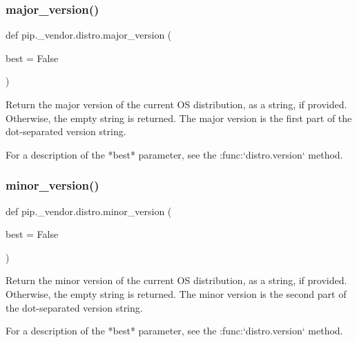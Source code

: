 \mbox{\label{namespacepip_1_1__vendor_1_1distro_a7ba57b1c4ee35dc171765941dd3ec476}} 
\subsubsection{\texorpdfstring{major\+\_\+version()}{major\_version()}}
{\footnotesize\ttfamily def pip.\+\_\+vendor.\+distro.\+major\+\_\+version (\begin{DoxyParamCaption}\item[{}]{best = {\ttfamily False} }\end{DoxyParamCaption})}

\begin{DoxyVerb}Return the major version of the current OS distribution, as a string,
if provided.
Otherwise, the empty string is returned. The major version is the first
part of the dot-separated version string.

For a description of the *best* parameter, see the :func:`distro.version`
method.
\end{DoxyVerb}
 \mbox{\label{namespacepip_1_1__vendor_1_1distro_a27fb0b8ec4acf78ab726aea7fa592bb9}} 
\subsubsection{\texorpdfstring{minor\+\_\+version()}{minor\_version()}}
{\footnotesize\ttfamily def pip.\+\_\+vendor.\+distro.\+minor\+\_\+version (\begin{DoxyParamCaption}\item[{}]{best = {\ttfamily False} }\end{DoxyParamCaption})}

\begin{DoxyVerb}Return the minor version of the current OS distribution, as a string,
if provided.
Otherwise, the empty string is returned. The minor version is the second
part of the dot-separated version string.

For a description of the *best* parameter, see the :func:`distro.version`
method.
\end{DoxyVerb}
 \mbox{\label{namespacepip_1_1__vendor_1_1distro_ac8123e12e7ecaf7e1c950d7dadde82b3}} 
